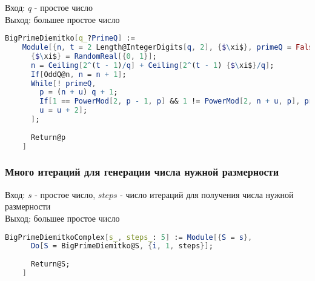       Вход: {$q$} - простое число \\
      Выход: большее простое число

      \begin{lstlisting}[language=Mathematica,caption={
	Теорема Диемитко (1 итерация)
      }]
	BigPrimeDiemitko[q_?PrimeQ] := 
	Module[{n, t = 2 Length@IntegerDigits[q, 2], {$\xi$}, primeQ = False, u = 0, p},
	  {$\xi$} = RandomReal[{0, 1}];
	  n = Ceiling[2^(t - 1)/q] + Ceiling[2^(t - 1) {$\xi$}/q];
	  If[OddQ@n, n = n + 1];
	  While[! primeQ,
	    p = (n + u) q + 1;
	    If[1 == PowerMod[2, p - 1, p] && 1 != PowerMod[2, n + u, p], primeQ = True,
	    u = u + 2];
	  ];
	
	  Return@p
	]
      \end{lstlisting}

    \subsubsection{Много итераций для генерации числа нужной размерности}
    
      Вход: {$s$} - простое число, {$steps$} - число итераций для получения числа нужной размерности \\
      Выход: большее простое число

      \begin{lstlisting}[language=Mathematica,caption={
	  Теорема Диемитко (много итераций)
      }]
	BigPrimeDiemitkoComplex[s_, steps_: 5] := Module[{S = s},
	  Do[S = BigPrimeDiemitko@S, {i, 1, steps}];
  
	  Return@S;
	]
      \end{lstlisting}